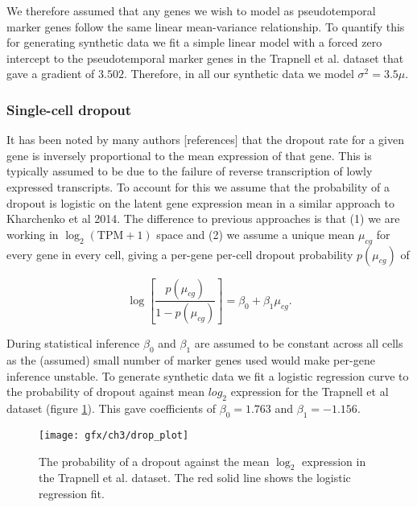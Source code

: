 We therefore assumed that any genes we wish to model as pseudotemporal marker genes follow the same linear mean-variance relationship. To quantify this for generating synthetic data we fit a simple linear model with a forced zero intercept to the pseudotemporal marker genes in the Trapnell et al. dataset that gave a gradient of $3.502$. Therefore, in all our synthetic data we model $\sigma^2 = 3.5 \mu$.


\subsubsection{Single-cell dropout}


It has been noted by many authors [references] that the dropout rate for a given gene is inversely proportional to the mean expression of that gene. This is typically assumed to be due to the failure of reverse transcription of lowly expressed transcripts. To account for this we assume that the probability of a dropout is logistic on the latent gene expression mean in a similar approach to Kharchenko et al 2014. The difference to previous approaches is that (1) we are working in $\log_2(\text{TPM} + 1)$ space and (2) we assume a unique mean $\mu_{cg}$ for every gene in every cell, giving a per-gene per-cell dropout probability $p(\mu_{cg})$ of

\begin{equation}
\log\left[ \frac{p(\mu_{cg})}{1 - p(\mu_{cg})} \right] = \beta_0 + \beta_1 \mu_{cg}.
\end{equation}

During statistical inference $\beta_0$ and $\beta_1$ are assumed to be constant across all cells as the (assumed) small number of marker genes used would make per-gene inference unstable. To generate synthetic data we fit a logistic regression curve to the probability of dropout against mean $log_2$ expression for the Trapnell et al dataset (figure \ref{fig:dropout}). This gave coefficients of $\beta_0 = 1.763$ and $\beta_1 = -1.156$.

\begin{figure}
\centering
 \texttt{[image: gfx/ch3/drop\_plot]}
 \caption{The probability of a dropout against the mean $\log_2$ expression in the Trapnell et al. dataset. The red solid line shows the logistic regression fit.} \label{fig:dropout}
 \end{figure}

